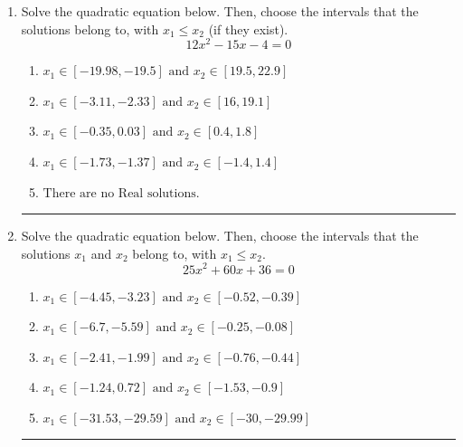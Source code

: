 \documentclass[14pt]{extbook}
\newcommand{\litem}[1]{\item#1\hspace*{-1cm}\rule{\textwidth}{0.4pt}}
\begin{document}
\begin{enumerate}
{\begin{enumerate}[label=\Alph*.]
\end{enumerate} }
\litem{
Solve the quadratic equation below. Then, choose the intervals that the solutions belong to, with $x_1 \leq x_2$ (if they exist).\[ 12x^{2} -15 x -4 = 0 \]\begin{enumerate}[label=\Alph*.]
\item \( x_1 \in [-19.98, -19.5] \text{ and } x_2 \in [19.5, 22.9] \)
\item \( x_1 \in [-3.11, -2.33] \text{ and } x_2 \in [16, 19.1] \)
\item \( x_1 \in [-0.35, 0.03] \text{ and } x_2 \in [0.4, 1.8] \)
\item \( x_1 \in [-1.73, -1.37] \text{ and } x_2 \in [-1.4, 1.4] \)
\item \( \text{There are no Real solutions.} \)

\end{enumerate} }
\litem{
Solve the quadratic equation below. Then, choose the intervals that the solutions $x_1$ and $x_2$ belong to, with $x_1 \leq x_2$.\[ 25x^{2} +60 x + 36 = 0 \]\begin{enumerate}[label=\Alph*.]
\item \( x_1 \in [-4.45, -3.23] \text{ and } x_2 \in [-0.52, -0.39] \)
\item \( x_1 \in [-6.7, -5.59] \text{ and } x_2 \in [-0.25, -0.08] \)
\item \( x_1 \in [-2.41, -1.99] \text{ and } x_2 \in [-0.76, -0.44] \)
\item \( x_1 \in [-1.24, 0.72] \text{ and } x_2 \in [-1.53, -0.9] \)
\item \( x_1 \in [-31.53, -29.59] \text{ and } x_2 \in [-30, -29.99] \)


\end{enumerate}}
\end{enumerate}
\end{document}
